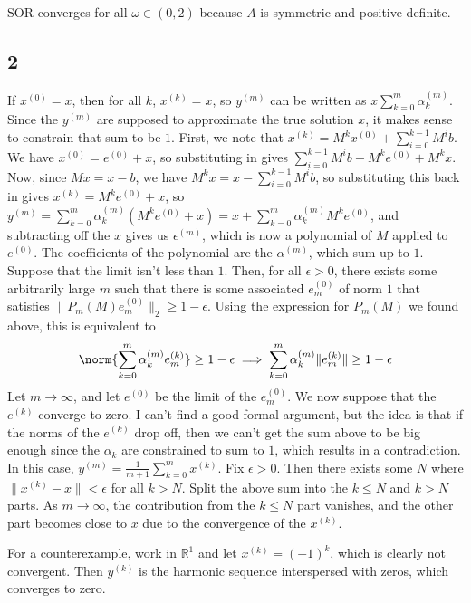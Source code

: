 \documentclass{article}
\newcommand{\ep}{\epsilon}
\newcommand{\rn}{\mathbb{R}}
\begin{document}
SOR converges for all $\omega\in(0,2)$ because $A$ is symmetric and positive definite.
\subsection*{2}
If $x^{(0)}=x$, then for all $k$, $x^{(k)}=x$, so $y^{(m)}$ can be written as $x\sum_{k=0}^m\alpha_k^{(m)}$. Since the $y^{(m)}$ are supposed to approximate the true solution $x$, it makes sense to constrain that sum to be $1$.
First, we note that $x^{(k)}=M^kx^{(0)}+\sum_{i=0}^{k-1}M^{i}b$. We have $x^{(0)}=e^{(0)}+x$, so substituting in gives $\sum_{i=0}^{k-1}M^{i}b+M^ke^{(0)}+M^kx$. Now, since $Mx=x-b$, we have $M^kx=x-\sum_{i=0}^{k-1}M^ib$, so substituting this back in gives $x^{(k)}=M^ke^{(0)}+x$, so $y^{(m)}=\sum_{k=0}^m\alpha_k^{(m)}(M^ke^{(0)}+x)=x+\sum_{k=0}^m\alpha_k^{(m)}M^ke^{(0)}$, and subtracting off the $x$ gives us $\ep^{(m)}$, which is now a polynomial of $M$ applied to $e^{(0)}$. The coefficients of the polynomial are the $\alpha^{(m)}$, which sum up to $1$.
Suppose that the limit isn't less than $1$. Then, for all $\ep>0$, there exists some arbitrarily large $m$ such that there is some associated $e_m^{(0)}$ of norm $1$ that satisfies $\|P_m(M)e_m^{(0)}\|_2\geq1-\ep$. Using the expression for $P_m(M)$ we found above, this is equivalent to 
\[\norm{\sum_{k=0}^m\alpha_k^{(m)}e_m^{(k)}}\geq1-\ep\implies\sum_{k=0}^m\alpha_k^{(m)}\|e_m^{(k)}\|\geq1-\ep\]
Let $m\to\infty$, and let $e^(0)$ be the limit of the $e_m^{(0)}$. We now suppose that the $e^{(k)}$ converge to zero. I can't find a good formal argument, but the idea is that if the norms of the $e^{(k)}$ drop off, then we can't get the sum above to be big enough since the $\alpha_k$ are constrained to sum to $1$, which results in a contradiction. 
In this case, $y^{(m)}=\frac{1}{m+1}\sum_{k=0}^mx^{(k)}$. Fix $\ep>0$. Then there exists some $N$ where $\|x^{(k)}-x\|<\ep$ for all $k>N$. Split the above sum into the $k\leq N$ and $k>N$ parts. As $m\to\infty$, the contribution from the $k\leq N$ part vanishes, and the other part becomes close to $x$ due to the convergence of the $x^{(k)}$.

For a counterexample, work in $\rn^1$ and let $x^{(k)}=(-1)^k$, which is clearly not convergent. Then $y^{(k)}$ is the harmonic sequence interspersed with zeros, which converges to zero. 
\end{document}
